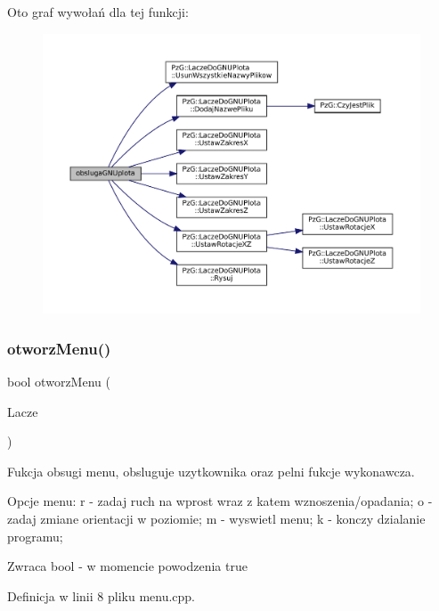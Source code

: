 Oto graf wywołań dla tej funkcji\+:\nopagebreak
\begin{figure}[H]
\begin{center}
\leavevmode
\includegraphics[width=350pt]{menu_8hh_a233cd71579a56ad0b2926d4c5217eaa1_cgraph}
\end{center}
\end{figure}
\mbox{\label{menu_8hh_a32a0a14b80567d267e3e6d831c2a517b}} 
\subsubsection{\texorpdfstring{otworzMenu()}{otworzMenu()}}
{\footnotesize\ttfamily bool otworz\+Menu (\begin{DoxyParamCaption}\item[{\mbox{\hyperlink{class_pz_g_1_1_lacze_do_g_n_u_plota}{Pz\+G\+::\+Lacze\+Do\+G\+N\+U\+Plota}}}]{Lacze }\end{DoxyParamCaption})}

Fukcja obsugi menu, obsluguje uzytkownika oraz pelni fukcje wykonawcza.

Opcje menu\+: r -\/ zadaj ruch na wprost wraz z katem wznoszenia/opadania; o -\/ zadaj zmiane orientacji w poziomie; m -\/ wyswietl menu; k -\/ konczy dzialanie programu;

\begin{DoxyReturn}{Zwraca}
bool -\/ w momencie powodzenia true 
\end{DoxyReturn}


Definicja w linii 8 pliku menu.\+cpp.

